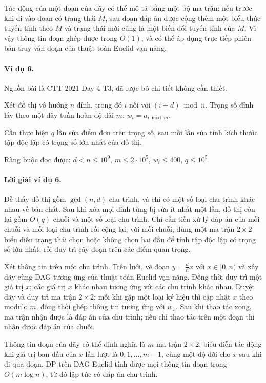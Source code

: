 \documentclass[11pt]{article}
\begin{document}
Tác động của một đoạn của dãy có thể mô tả bằng một bộ ma trận: nếu trước khi đi
vào đoạn có trạng thái $M$, sau đoạn đáp án được cộng thêm một biểu thức tuyến
tính theo $M$ và trạng thái mới cũng là một biến đổi tuyến tính của $M$. Vì vậy
thông tin đoạn ghép được trong $O(1)$, và có thể áp dụng trực tiếp phiên bản
truy vấn đoạn của thuật toán Euclid vạn năng.

\paragraph{Ví dụ 6.}
Nguồn bài là CTT 2021 Day 4 T3, đã lược bỏ chi tiết không cần thiết.

Xét đồ thị vô hướng $n$ đỉnh, trong đó $i$ nối với $(i+d)\bmod n$. Trọng số đỉnh
lấy theo một dãy tuần hoàn độ dài $m$: $w_i=a_{i\bmod m}$.

Cần thực hiện $q$ lần sửa điểm đơn trên trọng số, sau mỗi lần sửa tính kích
thước tập độc lập có trọng số lớn nhất của đồ thị.

Ràng buộc đọc được: $d<n\le 10^9$, $m\le 2\cdot 10^5$, $w_i\le 400$,
$q\le 10^5$.

\paragraph{Lời giải ví dụ 6.}
Dễ thấy đồ thị gồm $\gcd(n,d)$ chu trình, và chỉ có một số loại chu trình khác
nhau về bản chất. Sau khi xóa mọi đỉnh từng bị sửa ít nhất một lần, đồ thị còn
lại gồm $O(q)$ chuỗi và một số loại chu trình. Chỉ cần tiền xử lý đáp án của
mỗi chuỗi và mỗi loại chu trình rồi cộng lại; với mỗi chuỗi, dùng một ma trận
$2\times2$ biểu diễn trạng thái chọn hoặc không chọn hai đầu để tính tập độc lập
có trọng số lớn nhất, rồi duy trì cây đoạn trên các điểm quan trọng.

Xét thông tin trên một chu trình. Trên lưới, vẽ đoạn $y=\frac dnx$ với
$x\in[0,n)$ và xây dãy cùng DAG tương ứng của thuật toán Euclid vạn năng. Đồng
thời duy trì một giá trị $x$; các giá trị $x$ khác nhau tương ứng với các chu
trình khác nhau. Duyệt dãy và duy trì ma trận $2\times2$; mỗi khi gặp một loại
ký hiệu thì cập nhật $x$ theo modulo $m$, đồng thời ghép thông tin tương ứng với
$w_x$. Sau khi thao tác xong, ma trận nhận được là đáp án của chu trình; nếu chỉ
thao tác trên một đoạn thì nhận được đáp án của chuỗi.

Thông tin đoạn của dãy có thể định nghĩa là $m$ ma trận $2\times2$, biểu diễn
tác động khi giá trị ban đầu của $x$ lần lượt là $0,1,\ldots,m-1$, cùng một độ
dời cho $x$ sau khi đi qua đoạn. DP trên DAG Euclid tính được mọi thông tin đoạn
trong $O(m\log n)$, từ đó lập tức có đáp án chu trình.
\end{document}
